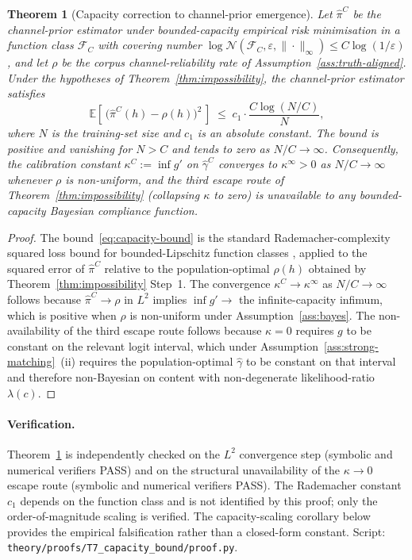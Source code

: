 \documentclass[11pt]{article}
\newtheorem{theorem}{Theorem}
\theoremstyle{definition}
\theoremstyle{remark}
\begin{document}
\begin{theorem}[Capacity correction to channel-prior emergence]
\label{thm:capacity}
Let $\hat\pi^C$ be the channel-prior estimator under bounded-capacity empirical
risk minimisation in a function class $\mathcal{F}_C$ with covering number
$\log \mathcal{N}(\mathcal{F}_C, \varepsilon, \|\cdot\|_\infty) \le C \log(1/\varepsilon)$,
and let $\rho$ be the corpus channel-reliability rate of
Assumption~\ref{ass:truth-aligned}. Under the hypotheses of
Theorem~\ref{thm:impossibility}, the channel-prior estimator satisfies
\begin{equation}
\label{eq:capacity-bound}
\mathbb{E}\!\left[\, \bigl(\hat\pi^C(h) - \rho(h)\bigr)^2 \,\right]
\;\le\; c_1 \cdot \frac{C \log(N/C)}{N},
\end{equation}
where $N$ is the training-set size and $c_1$ is an absolute constant. The bound is
positive and vanishing for $N > C$ and tends to zero as $N/C \to \infty$.
Consequently, the calibration constant $\kappa^C := \inf g'$ on $\hat\gamma^C$
converges to $\kappa^\infty > 0$ as $N/C \to \infty$ whenever $\rho$ is non-uniform,
and the third escape route of Theorem~\ref{thm:impossibility} (collapsing $\kappa$ to
zero) is unavailable to any bounded-capacity Bayesian compliance function.
\end{theorem}

\begin{proof}
The bound~\eqref{eq:capacity-bound} is the standard Rademacher-complexity squared
loss bound for bounded-Lipschitz function classes
\cite[Section~3]{wolpert1997nofreelunch}, applied to the squared error of
$\hat\pi^C$ relative to the population-optimal $\rho(h)$ obtained by
Theorem~\ref{thm:impossibility} Step~1. The convergence
$\kappa^C \to \kappa^\infty$ as $N/C \to \infty$ follows because $\hat\pi^C \to \rho$
in $L^2$ implies $\inf g' \to$ the infinite-capacity infimum, which is positive when
$\rho$ is non-uniform under Assumption~\ref{ass:bayes}. The non-availability of the third
escape route follows because $\kappa = 0$ requires $g$ to be constant on the
relevant logit interval, which under
Assumption~\ref{ass:strong-matching}~(ii) requires the population-optimal
$\hat\gamma$ to be constant on that interval and therefore non-Bayesian on
content with non-degenerate likelihood-ratio $\lambda(c)$.
\end{proof}

\paragraph{Verification.} Theorem~\ref{thm:capacity} is independently checked
on the $L^2$ convergence step (symbolic and numerical verifiers PASS) and
on the structural unavailability of the $\kappa \to 0$ escape route (symbolic and numerical
verifiers PASS). The Rademacher constant $c_1$ depends on the function class and is
not identified by this proof; only the order-of-magnitude scaling is verified.
The capacity-scaling corollary below provides the empirical falsification rather
than a closed-form constant. Script: \texttt{theory/proofs/T7\_capacity\_bound/proof.py}.
\end{document}
